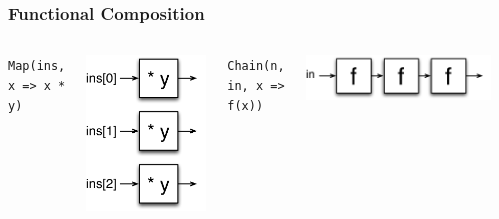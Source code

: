 \documentclass[xcolor=pdflatex,dvipsnames,table]{beamer}
\begin{document}
\begin{frame}
\frametitle{Functional Composition}


\begin{Large}
\begin{columns}

\verb+Map(ins, x => x * y)+ \\
\begin{center}
\includegraphics[height=0.6\textheight]{../../bootcamp/figs/map.pdf} \\[2cm]
\end{center}

\vskip2mm
\verb+Chain(n, in, x => f(x))+ \\
\begin{center}
\includegraphics[width=0.9\textwidth]{../../bootcamp/figs/chain.pdf} \\
\end{center}


\end{columns}
\end{Large}
\end{frame}
\end{document}
